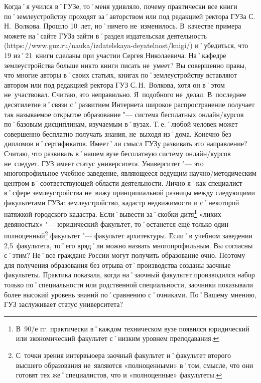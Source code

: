 \begin{drama}
	\maxspeaks Когда˚я учился в˚ГУЗе, то˚меня удивляло, почему практически все книги по˚землеустройству проходят за˚авторством или под редакцией ректора ГУЗа С.\,Н.~Волкова. Прошло 10~лет, но˚ничего не~изменилось. В~качестве примера можете на˚сайте ГУЗа зайти в˚раздел издательская деятельность (https://www.guz.ru/nauka/izdatelskaya-deyatelnost/knigi/) и˚убедиться, что 19 из˚21~книги сделаны при участии Сергея Николаевича. На˚кафедре землеустройства больше никто книги писать не~умеет? 
	\michaelspeaks Вы совершенно правы, что многие авторы в˚своих статьях, книгах по˚землеустройству вставляют автором или под редакцией ректора ГУЗ С.\,Н.~Волкова, хотя он в˚этом не~участвовал. Считаю, это неправильно. Я~подобного не~делал. 
	\maxspeaks В~последнее десятилетие в˚связи с˚развитием Интернета широкое распространение получает так называемое открытое образование "--- система бесплатных онлайн\-/курсов по˚базовым дисциплинам, изучаемым в˚вузах. Т.\,е.˚любой человек может совершенно бесплатно получать знания, не~выходя из˚дома. Конечно без дипломов и˚сертификатов. Имеет˚ли смысл ГУЗу развивать это направление?
	\michaelspeaks Считаю, что развивать в˚нашем вузе бесплатную систему онлайн\-/курсов не~следует.
	\maxspeaks ГУЗ имеет статус университета. Университет "--- это многопрофильное учебное заведение, являющееся ведущим научно\-/методическим центром в˚соответствующей области деятельности. 
Лично я˚как специалист в˚сфере землеустройства не~вижу принципиальной разницы между следующими факультетами ГУЗа: землеустройство, кадастр недвижимости и с˚некоторой натяжкой городского кадастра. Если˚вывести за˚скобки дитя\footnote{В~90\=/е гг. практически в˚каждом техническом вузе появился юридический или экономический факультет с˚низким уровнем преподавания.}  «лихих девяностых» "--- юридический факультет, то˚останется ещё только один полноценный\footnote{С~точки зрения интервьюера заочный факультет и˚факультет второго высшего образования не~являются  «полноценными» в˚том, смысле, что они готовят тех же˚специалистов, что и  «полноценные» факультеты.} факультет "--- факультет архитектуры. Если˚в учебном заведении 2,5~факультета, то˚его вряд˚ли можно назвать многопрофильным. Вы согласны с˚этим?
	\michaelspeaks Не˚все граждане России могут получить образование очно. Поэтому для получения образования без отрыва от˚производства созданы заочные факультеты. Практика показала, когда на˚заочный факультет производился набор только по˚специальности или родственной специальности, заочники показывали более высокий уровень знаний по˚сравнению с˚очниками.
	\maxspeaks По˚Вашему мнению, ГУЗ заслуживает статус университета?

\end{drama}
